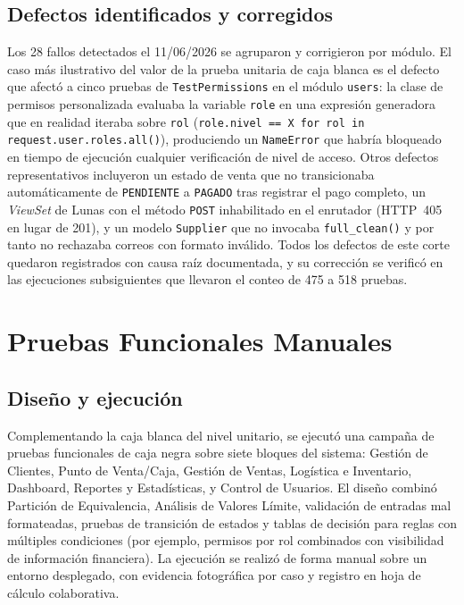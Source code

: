 \documentclass[conference]{IEEEtran}
\begin{document}
\subsection{Defectos identificados y corregidos}

Los 28 fallos detectados el 11/06/2026 se agruparon y corrigieron por módulo. El caso más ilustrativo del valor de la prueba unitaria de caja blanca es el defecto que afectó a cinco pruebas de \texttt{TestPermissions} en el módulo \texttt{users}: la clase de permisos personalizada evaluaba la variable \texttt{role} en una expresión generadora que en realidad iteraba sobre \texttt{rol} (\texttt{role.nivel == X for rol in request.user.roles.all()}), produciendo un \texttt{NameError} que habría bloqueado en tiempo de ejecución cualquier verificación de nivel de acceso. Otros defectos representativos incluyeron un estado de venta que no transicionaba automáticamente de \texttt{PENDIENTE} a \texttt{PAGADO} tras registrar el pago completo, un \emph{ViewSet} de Lunas con el método \texttt{POST} inhabilitado en el enrutador (HTTP~405 en lugar de 201), y un modelo \texttt{Supplier} que no invocaba \texttt{full\_clean()} y por tanto no rechazaba correos con formato inválido. Todos los defectos de este corte quedaron registrados con causa raíz documentada, y su corrección se verificó en las ejecuciones subsiguientes que llevaron el conteo de 475 a 518 pruebas.

\section{Pruebas Funcionales Manuales}
\label{sec:functional}

\subsection{Diseño y ejecución}

Complementando la caja blanca del nivel unitario, se ejecutó una campaña de pruebas funcionales de caja negra sobre siete bloques del sistema: Gestión de Clientes, Punto de Venta/Caja, Gestión de Ventas, Logística e Inventario, Dashboard, Reportes y Estadísticas, y Control de Usuarios. El diseño combinó Partición de Equivalencia, Análisis de Valores Límite, validación de entradas mal formateadas, pruebas de transición de estados y tablas de decisión para reglas con múltiples condiciones (por ejemplo, permisos por rol combinados con visibilidad de información financiera). La ejecución se realizó de forma manual sobre un entorno desplegado, con evidencia fotográfica por caso y registro en hoja de cálculo colaborativa.
\end{document}
